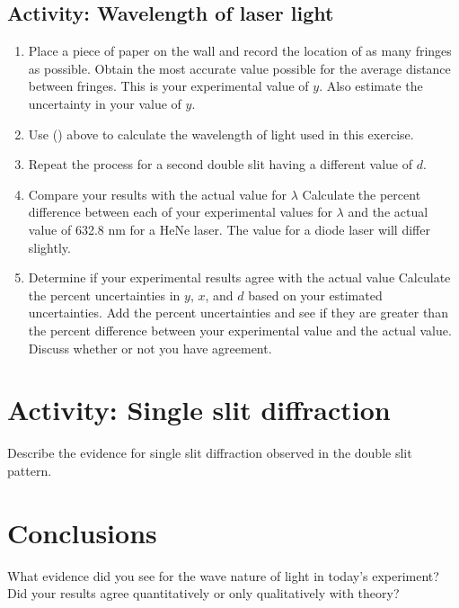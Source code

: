 \begin{multicols}{2}
\subsection{Activity: Wavelength of laser light}
\begin{enumerate}
	 \item 	Place a piece of paper on the wall and record the location of as many fringes as possible.  Obtain the most accurate value possible for the average distance between fringes.  This is your experimental value of $y$.  Also estimate the uncertainty in your value of $y$.
	 \item Use () above to calculate the wavelength of light used in this exercise.
	 \item Repeat the process for a second double slit having a different value of $d$.
	 \item Compare your results with the actual value for $\lambda$
	Calculate the percent difference between each of your experimental values for $\lambda$ and the actual value of 632.8 nm for a HeNe laser. The value for a diode laser will differ slightly.
	\item Determine if your experimental results agree with the actual value
	Calculate the percent uncertainties in $y$, $x$, and $d$ based on your estimated uncertainties.  Add the percent uncertainties and see if they are greater than the percent difference between your experimental value and the actual value.  Discuss whether or not you have agreement.
\end{enumerate}

\section{Activity: Single slit diffraction}
	Describe the evidence for single slit diffraction observed in the double slit pattern.

\section {Conclusions} What evidence did you see for the wave nature of light in today's experiment?  Did your results agree quantitatively or only qualitatively with theory?
 
\end{multicols}
\endinput
